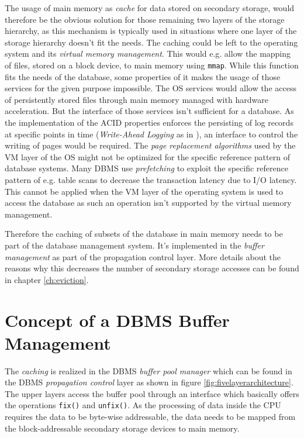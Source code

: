 	The usage of main memory as \emph{cache} for data stored on secondary storage, would therefore be the obvious solution for those remaining two layers of the storage hierarchy, as this mechanism is typically used in situations where one layer of the storage hierarchy doesn't fit the needs. The caching could be left to the operating system and its \emph{virtual memory management}. This would e.g. allow the mapping of files, stored on a block device, to main memory using \lstinline{mmap}. While this function fits the needs of the database, some properties of it makes the usage of those services for the given purpose impossible. The OS services would allow the access of persistently stored files through main memory managed with hardware acceleration. But the interface of those services isn't sufficient for a database. As the implementation of the ACID properties enforces the persisting of log records at specific points in time (\emph{Write-Ahead Logging} as in \cite{Mohan:1992}), an interface to control the writing of pages would be required. The \emph{page replacement algorithms} used by the VM layer of the OS might not be optimized for the specific reference pattern of database systems. Many DBMS use \emph{prefetching} to exploit the specific reference pattern of e.g. table scans to decrease the transaction latency due to I/O latency. This cannot be applied when the VM layer of the operating system is used to access the database as such an operation isn't supported by the virtual memory management.
	
	Therefore the caching of subsets of the database in main memory needs to be part of the database management system. It's implemented in the \emph{buffer management} as part of the propagation control layer. More details about the reasons why this decreases the number of secondary storage accesses can be found in chapter \ref{ch:eviction}.
	
\section[Concept of a DBMS Buffer Management]{Concept of a DBMS Buffer Management}

	The \emph{caching} is realized in the DBMS \emph{buffer pool manager} which can be found in the DBMS \emph{propagation control} layer as shown in figure \ref{fig:fivelayerarchitecture}. The upper layers access the buffer pool through an interface which basically offers the operations \lstinline{fix()} and \lstinline{unfix()}. As the processing of data inside the CPU requires the data to be byte-wise addressable, the data needs to be mapped from the block-addressable secondary storage devices to main memory.
	
